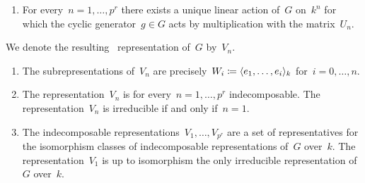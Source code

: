 \begin{proposition}
  \leavevmode
  \begin{enumerate}
    \item
      For every~$n = 1, \dotsc, p^r$ there exists a unique linear action of~$G$ on~$k^n$ for which the cyclic generator~$g \in G$ acts by multiplication with the matrix~$U_n$.
  \end{enumerate}
  We denote the resulting~ representation of~$G$ by~$V_n$.
  \begin{enumerate}[resume]
    \item
      \label{classification of subrep}
      The subrepresentations of~$V_n$ are precisely~$W_i \coloneqq \langle e_1, \dotsc, e_i\rangle_k$ for~$i = 0, \dotsc, n$.
    \item
      The representation~$V_n$ is for every~$n = 1, \dotsc, p^r$ indecomposable.
      The representation~$V_n$ is irreducible if and only if~$n = 1$.
    \item
      The indecomposable representations~$V_1, \dotsc, V_{p^r}$ are a set of representatives for the isomorphism classes of {\fd} indecomposable representations of~$G$ over~$k$.
      The representation~$V_1$ is up to isomorphism the only irreducible representation of~$G$ over~$k$.
  \end{enumerate}
\end{proposition}


